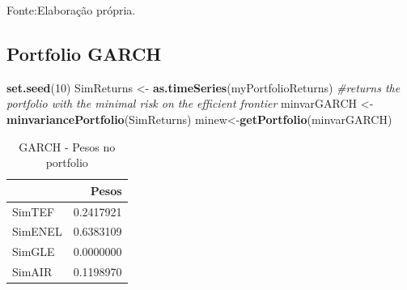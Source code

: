 \documentclass[
  12pt,
  a4paper,
  openany]{book}
\newenvironment{Shaded}{\begin{snugshade}}{\end{snugshade}}
\newcommand{\CommentTok}[1]{\textcolor[rgb]{0.56,0.35,0.01}{\textit{#1}}}
\newcommand{\DataTypeTok}[1]{\textcolor[rgb]{0.13,0.29,0.53}{#1}}
\newcommand{\DecValTok}[1]{\textcolor[rgb]{0.00,0.00,0.81}{#1}}
\newcommand{\FloatTok}[1]{\textcolor[rgb]{0.00,0.00,0.81}{#1}}
\newcommand{\KeywordTok}[1]{\textcolor[rgb]{0.13,0.29,0.53}{\textbf{#1}}}
\newcommand{\NormalTok}[1]{#1}
\newcommand{\OperatorTok}[1]{\textcolor[rgb]{0.81,0.36,0.00}{\textbf{#1}}}
\newcommand{\StringTok}[1]{\textcolor[rgb]{0.31,0.60,0.02}{#1}}
\begin{document}
Fonte:Elaboração própria.

\justifying
\bigskip

\hypertarget{portfolio-garch}{%
\subsection{Portfolio GARCH}\label{portfolio-garch}}

\scriptsize

\begin{Shaded}
\begin{Highlighting}[]
\KeywordTok{set.seed}\NormalTok{(}\DecValTok{10}\NormalTok{)}
\NormalTok{SimReturns \textless{}{-}}\StringTok{ }\KeywordTok{as.timeSeries}\NormalTok{(myPortfolioReturns)}
\CommentTok{\#returns the portfolio with the minimal risk on the efficient frontier}
\NormalTok{minvarGARCH \textless{}{-}}\StringTok{ }\KeywordTok{minvariancePortfolio}\NormalTok{(SimReturns) }
\NormalTok{minew\textless{}{-}}\KeywordTok{getPortfolio}\NormalTok{(minvarGARCH)}
\end{Highlighting}
\end{Shaded}

\normalsize

\begin{table}[!h]

\caption{\label{tab:unnamed-chunk-53}GARCH - Pesos no portfolio}
\centering
\begin{tabular}[t]{lr}
\toprule
  & Pesos\\
\midrule
SimTEF & 0.2417921\\
SimENEL & 0.6383109\\
SimGLE & 0.0000000\\
SimAIR & 0.1198970\\
\bottomrule
\end{tabular}
\end{table}

\scriptsize

\begin{Shaded}
\end{Shaded}
\end{document}
